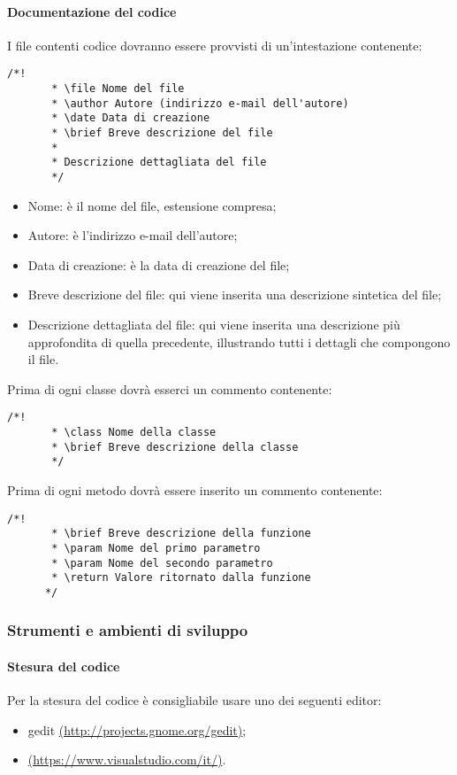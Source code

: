   \paragraph{Documentazione del codice}
     I file contenti codice dovranno essere provvisti di un'intestazione contenente:
     \begin{lstlisting}[frame=single]
       /*!
       * \file Nome del file
       * \author Autore (indirizzo e-mail dell'autore)
       * \date Data di creazione
       * \brief Breve descrizione del file
       *
       * Descrizione dettagliata del file
       */
     \end{lstlisting}
     \begin{itemize}
     \item Nome: è il nome del file, estensione compresa;
     \item Autore: è l'indirizzo e-mail dell'autore;
     \item Data di creazione: è la data di creazione del file;
     \item Breve descrizione del file: qui viene inserita una descrizione sintetica del file;
     \item Descrizione dettagliata del file: qui viene inserita una descrizione più approfondita di quella precedente, illustrando tutti i dettagli che compongono il file.
     \end{itemize}
     Prima di ogni classe dovrà esserci un commento contenente:
     \begin{lstlisting}[frame=single]
       /*!
       * \class Nome della classe
       * \brief Breve descrizione della classe
       */
     \end{lstlisting}

     Prima di ogni metodo dovrà essere inserito un commento contenente:
     \begin{lstlisting}[frame=single]
       /*!
       * \brief Breve descrizione della funzione
       * \param Nome del primo parametro
       * \param Nome del secondo parametro
       * \return Valore ritornato dalla funzione
      */
  \end{lstlisting}
      
\subsubsection{Strumenti e ambienti di sviluppo}
\paragraph{Stesura del codice}
Per la stesura del codice è consigliabile usare uno dei seguenti editor:
\begin{itemize}
\item gedit \href{http://projects.gnome.org/gedit}{(http://projects.gnome.org/gedit)};
\item {} \href{https://www.visualstudio.com/it/}{(https://www.visualstudio.com/it/)}.
\end{itemize}

